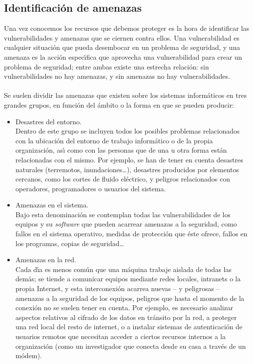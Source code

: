 \subsection{Identificaci\'on de amenazas}
Una vez conocemos los recursos que debemos proteger es la hora de identificar
las vulnerabilidades y amenazas que se ciernen contra ellos. Una vulnerabilidad
es cualquier situaci\'on que pueda desembocar en un problema de seguridad, y
una amenaza es la acci\'on espec\'{\i}fica que aprovecha una vulnerabilidad 
para crear un problema de seguridad; entre ambas existe una estrecha relaci\'on:
sin vulnerabilidades no hay amenazas, y sin amenazas no hay vulnerabilidades.\\
\\Se suelen dividir las amenazas que existen sobre los sistemas inform\'aticos
en tres grandes grupos, en funci\'on del \'ambito o la forma en que se pueden
producir:
\begin{itemize}
\item Desastres del entorno.\\
Dentro de este grupo se incluyen todos los posibles problemas relacionados con
la ubicaci\'on del entorno de trabajo inform\'atico o de la propia 
organizaci\'on, as\'{\i} como con las personas que de una u otra forma est\'an
relacionadas con el mismo. Por ejemplo, se han de tener en cuenta desastres
naturales (terremotos, inundaciones\ldots), desastres producidos por elementos
cercanos, como los cortes de fluido el\'ectrico, y peligros relacionados con 
operadores, programadores o usuarios del sistema.
\item Amenazas en el sistema.\\
Bajo esta denominaci\'on se contemplan todas las vulnerabilidades de los 
equipos y su {\it software} que pueden acarrear amenazas a la seguridad, como 
fallos en el sistema operativo, medidas de protecci\'on que \'este ofrece, 
fallos en los programas, copias de seguridad\ldots
\item Amenazas en la red.\\
Cada d\'{\i}a es menos com\'un que una m\'aquina trabaje aislada de todas las
dem\'as; se tiende a comunicar equipos mediante redes locales, intranets o la
propia Internet, y esta interconexi\'on acarrea nuevas -- y peligrosas -- 
amenazas a la seguridad de los equipos, peligros que hasta el momento de la
conexi\'on no se suelen tener en cuenta. Por ejemplo, es necesario analizar
aspectos relativos al cifrado de los datos en tr\'ansito por la red, a proteger
una red local del resto de internet, o a instalar sistemas de autenticaci\'on
de usuarios remotos que necesitan acceder a ciertos recursos internos a la
organizaci\'on (como un investigador que conecta desde su casa a trav\'es de
un m\'odem).
\end{itemize}
